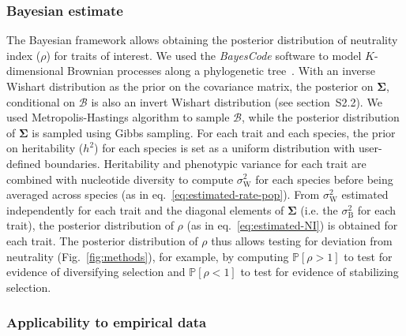 \documentclass{article}
\newcommand{\UniDimArray}[1]{\bm{#1}}
\newcommand{\BiDimArray}[1]{\bm{#1}}
\newcommand{\proba}{\mathbb{P}}
\newcommand{\Heritability}{h^2}
\newcommand{\RateBetween}{\sigma^2_{\mathrm{B}}}
\newcommand{\RateWhithin}{\sigma^2_{\mathrm{W}}}
\newcommand{\NI}{\rho}
\newcommand{\Ntrait}{K}
\newcommand{\Covariancematrix}{\Sigma}
\newcommand{\CovarianceMatrix}{\BiDimArray{\Covariancematrix}}
\newcommand{\brownian}{\mathcal{B}}
\newcommand{\Brownian}{\UniDimArray{\brownian}}
\begin{document}
\subsubsection*{Bayesian estimate}
The Bayesian framework allows obtaining the posterior distribution of neutrality index ($\NI$) for traits of interest.
We used the \textit{BayesCode} software to model $\Ntrait$-dimensional Brownian processes along a phylogenetic tree~\citep{latrille_inferring_2021}.
With an inverse Wishart distribution as the {prior} on the covariance matrix, the {posterior} on $\CovarianceMatrix$, conditional on $\brownian$ is also an invert Wishart distribution (see section~S2.2).
We used Metropolis-Hastings algorithm to sample $\Brownian$, while the posterior distribution of $\CovarianceMatrix$ is sampled using Gibbs sampling.
For each trait and each species, the prior on heritability ($\Heritability$) for each species is set as a uniform distribution with user-defined boundaries.
Heritability and phenotypic variance for each trait are combined with nucleotide diversity to compute $\RateWhithin$ for each species before being averaged across species (as in eq.~\ref{eq:estimated-rate-pop}).
From $\RateWhithin$ estimated independently for each trait and the diagonal elements of $\CovarianceMatrix$ (i.e. the $\RateBetween$ for each trait), the posterior distribution of $\NI$ (as in eq.~\ref{eq:estimated-NI}) is obtained for each trait.
The posterior distribution of $\NI$ thus allows testing for deviation from neutrality (Fig.~\ref{fig:methods}), for example, by computing $\proba [\NI > 1 ]$ to test for evidence of diversifying selection and $\proba [\NI < 1 ]$ to test for evidence of stabilizing selection.

\subsubsection*{Applicability to empirical data}
\end{document}
